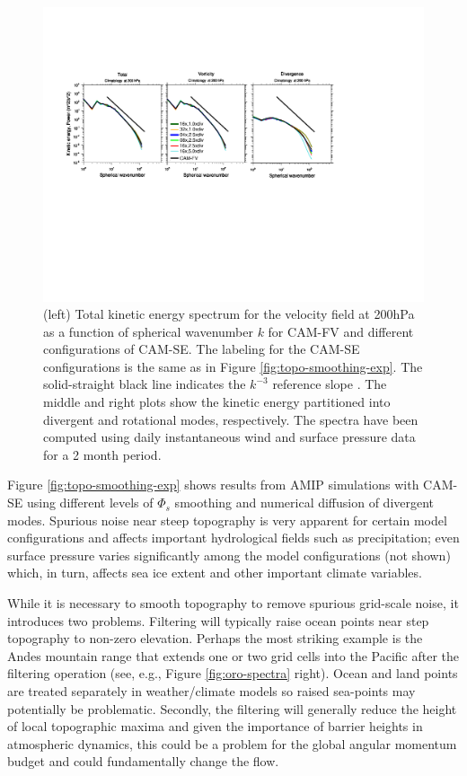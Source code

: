 \documentclass[gmd]{copernicus}
\begin{document}
\begin{figure}[t]
\vspace*{2mm}
\begin{center}
\includegraphics[width=12cm]{fig/TKE-fig}
\end{center}
  \caption{(left) Total kinetic energy spectrum for the velocity field at 200hPa as a function of spherical wavenumber $k$ for CAM-FV and different configurations of CAM-SE. The labeling for the CAM-SE configurations is the same as in Figure \ref{fig:topo-smoothing-exp}. The solid-straight black line indicates the $k^{-3}$ reference slope \citep{NG1985JAS}. The middle and right plots show the kinetic energy partitioned into divergent and rotational modes, respectively. The spectra have been computed using daily instantaneous wind and surface pressure data for a 2 month period.}\label{fig:tke}
\end{figure}




Figure \ref{fig:topo-smoothing-exp} shows results from AMIP simulations with CAM-SE using different levels of $\Phi_s$ smoothing and numerical diffusion of divergent modes. Spurious noise near steep topography is very apparent for certain model configurations and affects important hydrological fields such as precipitation; even surface pressure varies significantly among the model configurations (not shown) which, in turn, affects sea ice extent and other important climate variables. 

While it is necessary to smooth topography to remove spurious grid-scale noise, it introduces two problems. Filtering will typically raise ocean points near step topography to non-zero elevation. Perhaps the most striking example is the Andes mountain range that extends one or two grid cells into the Pacific after the filtering operation (see, e.g., Figure \ref{fig:oro-spectra} right). Ocean and land points are treated separately in weather/climate models so raised sea-points may potentially be problematic. Secondly, the filtering will generally reduce the height of local topographic maxima and given the importance of barrier heights in atmospheric dynamics, this could be a problem for the global angular momentum budget and could fundamentally change the flow. 
\end{document}
